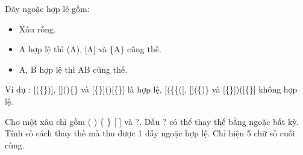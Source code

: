 Dãy ngoặc hợp lệ gồm:
\begin{itemize}
	\item Xâu rỗng.
	\item A hợp lệ thì (A), [A] và \{A\} cũng thế.
	\item A, B hợp lệ thì AB cũng thế.
\end{itemize}

Ví dụ : [(\{\})], []()\{\} và [\{\}]()[\{\}] là hợp lệ, [(\{\{([, [](\{)\} và [\{\}])([\{\}] không hợp lệ.

Cho một xâu chỉ gồm ( ) \{ \} [ ] và ?. Dấu ? có thể thay thế bằng ngoặc bất kỳ. Tính số cách thay thế mà thu được 1 dẫy ngoặc hợp lệ. Chỉ hiện 5 chữ số cuối cùng.

\